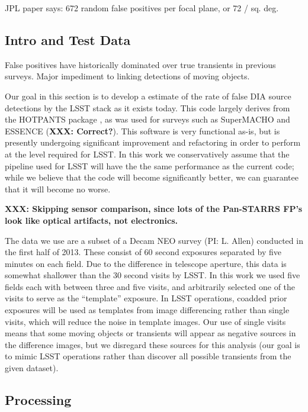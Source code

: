 JPL paper says: 672 random false positives per focal plane, or 72 / sq. deg. 

\subsection{Intro and Test Data}

False positives have historically dominated over true transients in previous
surveys. \citep{denneau13, goldstein15, kessler15} Major impediment to linking
detections of moving objects.

Our goal in this section is to develop a estimate of the rate of
false DIA source detections by the LSST stack as it exists today. This code
largely derives from the HOTPANTS package \citep{becker15}, as was used for
surveys such as SuperMACHO and ESSENCE (\textbf{XXX: Correct?}). This software
is very functional as-is, but is presently undergoing significant improvement
and refactoring in order to perform at the level required for LSST. In this work
we conservatively assume that the pipeline used for LSST will have the the same
performance as the current code; while we believe that the code will become
significantly better, we can guarantee that it will become no worse.

\textbf{XXX: Skipping sensor comparison, since lots of the Pan-STARRS FP's look like
optical artifacts, not electronics.}

The data we use are a subset of a Decam NEO survey (PI: L. Allen) conducted in
the first half of 2013. These consist of 60 second exposures separated by five
minutes on each field. Due to the difference in telescope aperture, this data is
somewhat shallower than the 30 second visits by LSST. In this work we used five
fields each with between three and five visits, and arbitrarily selected one of
the visits to serve as the ``template'' exposure. In LSST operations, coadded
prior exposures will be used as templates from image differencing rather than
single visits, which will reduce the noise in template images. Our use of single
visits means that some moving objects or transients will appear as negative
sources in the difference images, but we disregard these sources for this
analysis (our goal is to mimic LSST operations rather than discover all possible
transients from the given dataset).

\subsection{Processing}

